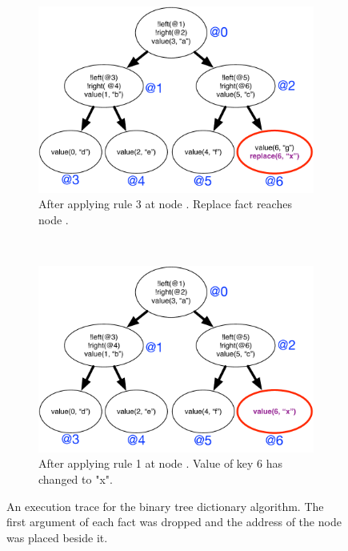 \begin{figure}[h]
\begin{subfigure}[b]{0.5\textwidth}
                \label{fig:language:btree_trace2}
        \end{subfigure}\\
        \begin{subfigure}[b]{0.5\textwidth}
                \includegraphics[width=\textwidth]{figures/btree/btree_trace3}
                \caption{After applying rule 3 at node . Replace fact
                   reaches node .}
                \label{fig:language:btree_trace3}
        \end{subfigure}%
        ~
        \begin{subfigure}[b]{0.5\textwidth}
                  \includegraphics[width=\textwidth]{figures/btree/btree_trace4}
                  \caption{After applying rule 1 at node . Value of key
                  6 has changed to "x".}
                  \label{fig:language:btree_trace4}
          \end{subfigure}
        \caption{An execution trace for the binary tree dictionary
           algorithm. The first argument of each fact was dropped and the
           address of the node was placed beside it.}\label{fig:language:btree_trace}
\end{figure}


